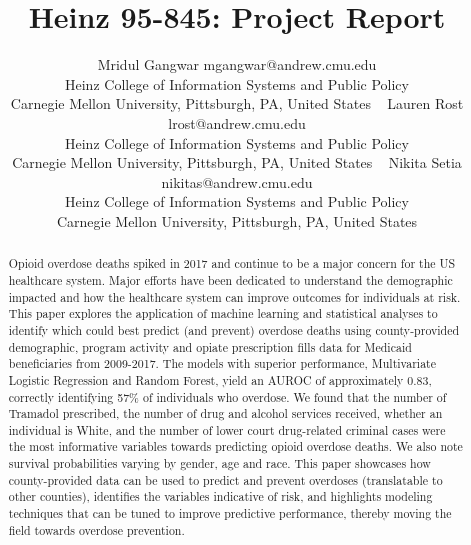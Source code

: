 \documentclass[twoside,10.5pt]{article}
\begin{document}
\title{Heinz 95-845: Project Report}

\author{\name Mridul Gangwar \email mgangwar@andrew.cmu.edu \\
       \addr Heinz College of Information Systems and Public Policy\\
       Carnegie Mellon University, Pittsburgh, PA, United States \
       \AND
       \name Lauren Rost \email lrost@andrew.cmu.edu \\
       \addr Heinz College of Information Systems and Public Policy\\
       Carnegie Mellon University, Pittsburgh, PA, United States \
       \AND
       \name Nikita Setia \email nikitas@andrew.cmu.edu \\
       \addr Heinz College of Information Systems and Public Policy\\
       Carnegie Mellon University, Pittsburgh, PA, United States}
       
\maketitle
\vspace*{5px}
\begin{abstract}
Opioid overdose deaths spiked in 2017 and continue to be a major concern for the US healthcare system. Major efforts have been dedicated to understand the demographic impacted and how the healthcare system can improve outcomes for individuals at risk. This paper explores the application of machine learning and statistical analyses to identify which could best predict (and prevent) overdose deaths using county-provided demographic, program activity and opiate prescription fills data for Medicaid beneficiaries from 2009-2017. The models with superior performance, Multivariate Logistic Regression and Random Forest, yield an AUROC of approximately 0.83, correctly identifying 57\% of individuals who overdose. We found that the number of Tramadol prescribed, the number of drug and alcohol services received, whether an individual is White, and the number of lower court drug-related criminal cases were the most informative variables towards predicting opioid overdose deaths. We also note survival probabilities varying by gender, age and race. This paper showcases how county-provided data can be used to predict and prevent overdoses (translatable to other counties), identifies the variables indicative of risk, and highlights modeling techniques that can be tuned to improve predictive performance, thereby moving the field towards overdose prevention.  
\end{abstract}
\end{document}
